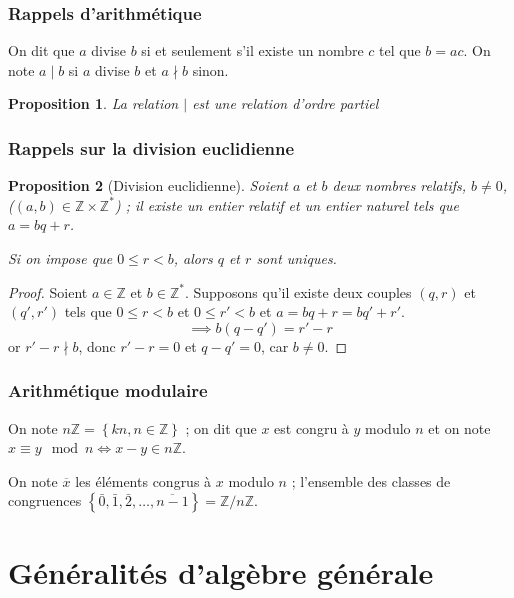\documentclass[french]{beamer}
\newtheorem{proposition}{Proposition}
\newcommand{\Z}{\mathbb{Z}}
\begin{document}
\begin{frame}[allowframebreaks]
  \frametitle{Rappels d'arithmétique}
  \begin{definition}[Divisibilité]
    On dit que $a$ divise $b$ si et seulement s'il existe un nombre $c$
    tel que $b=ac$. On note $a\mid b$ si $a$ divise $b$ et $a \nmid
    b$ sinon.
  \end{definition}
  \begin{proposition}
    La relation $\mid$ est une relation d'ordre partiel
  \end{proposition}
\end{frame}

\begin{frame}
  \frametitle{Rappels sur la division euclidienne}
  \begin{proposition}[Division euclidienne]
    Soient $a$ et $b$ deux nombres relatifs, $b\neq 0$, ($(a,b)\in
    \Z\times\Z^*$) ; il existe un entier relatif et un entier naturel
    tels que $a=bq+r$.

    Si on impose que $0\leq r<b$, alors $q$ et $r$ sont uniques.
  \end{proposition}

  \begin{proof}
    Soient $a\in\Z$ et $b\in\Z^*$. Supposons qu'il existe deux couples
    $(q,r)$ et $(q',r')$ tels que $0 \leq r<b$ et $0\leq r'<b$ et $a =
    bq + r = bq' + r'$.  \[ \implies b(q - q') = r' - r \] or $r' - r
    \nmid b$, donc $r' - r = 0$ et $q -q'=0$, car $b\neq 0$.
  \end{proof}
\end{frame}

\begin{frame}
  \frametitle{Arithmétique modulaire}
  \begin{definition}
    On note $n\Z = \left\lbrace kn, n\in\Z \right\rbrace$ ; on dit que
    $x$ est congru à $y$ modulo $n$ et on note $x\equiv y \mod n \iff
    x-y \in n\Z$.

    On note $\overline{x}$ les éléments congrus à $x$ modulo $n$ ;
    l'ensemble des classes de congruences $\left\lbrace \bar0, \bar1,
    \bar2, …, \overline{n-1} \right\rbrace = \Z/n\Z$.
  \end{definition}
\end{frame}

\section{Généralités d'algèbre générale}
\end{document}
